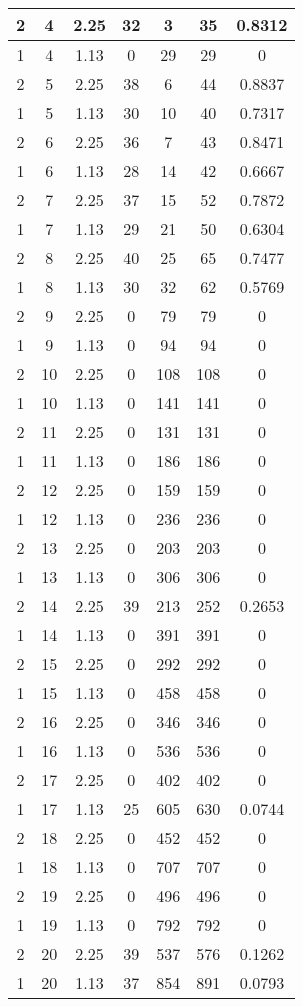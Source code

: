 \documentclass[letterpaper, 12pt]{article}
\begin{document}
\begin{longtable}{|c|c|c|c|c|c|c|}
\hline
2 & 4 & 2.25 & 32 & 3 & 35 & 0.8312 \\
\hline
1 & 4 & 1.13 & 0 & 29 & 29 & 0 \\
\hline
2 & 5 & 2.25 & 38 & 6 & 44 & 0.8837 \\
\hline
1 & 5 & 1.13 & 30 & 10 & 40 & 0.7317 \\
\hline
2 & 6 & 2.25 & 36 & 7 & 43 & 0.8471 \\
\hline
1 & 6 & 1.13 & 28 & 14 & 42 & 0.6667 \\
\hline
2 & 7 & 2.25 & 37 & 15 & 52 & 0.7872 \\
\hline
1 & 7 & 1.13 & 29 & 21 & 50 & 0.6304 \\
\hline
2 & 8 & 2.25 & 40 & 25 & 65 & 0.7477 \\
\hline
1 & 8 & 1.13 & 30 & 32 & 62 & 0.5769 \\
\hline
2 & 9 & 2.25 & 0 & 79 & 79 & 0 \\
\hline
1 & 9 & 1.13 & 0 & 94 & 94 & 0 \\
\hline
2 & 10 & 2.25 & 0 & 108 & 108 & 0 \\
\hline
1 & 10 & 1.13 & 0 & 141 & 141 & 0 \\
\hline
2 & 11 & 2.25 & 0 & 131 & 131 & 0 \\
\hline
1 & 11 & 1.13 & 0 & 186 & 186 & 0 \\
\hline
2 & 12 & 2.25 & 0 & 159 & 159 & 0 \\
\hline
1 & 12 & 1.13 & 0 & 236 & 236 & 0 \\
\hline
2 & 13 & 2.25 & 0 & 203 & 203 & 0 \\
\hline
1 & 13 & 1.13 & 0 & 306 & 306 & 0 \\
\hline
2 & 14 & 2.25 & 39 & 213 & 252 & 0.2653 \\
\hline
1 & 14 & 1.13 & 0 & 391 & 391 & 0 \\
\hline
2 & 15 & 2.25 & 0 & 292 & 292 & 0 \\
\hline
1 & 15 & 1.13 & 0 & 458 & 458 & 0 \\
\hline
2 & 16 & 2.25 & 0 & 346 & 346 & 0 \\
\hline
1 & 16 & 1.13 & 0 & 536 & 536 & 0 \\
\hline
2 & 17 & 2.25 & 0 & 402 & 402 & 0 \\
\hline
1 & 17 & 1.13 & 25 & 605 & 630 & 0.0744 \\
\hline
2 & 18 & 2.25 & 0 & 452 & 452 & 0 \\
\hline
1 & 18 & 1.13 & 0 & 707 & 707 & 0 \\
\hline
2 & 19 & 2.25 & 0 & 496 & 496 & 0 \\
\hline
1 & 19 & 1.13 & 0 & 792 & 792 & 0 \\
\hline
2 & 20 & 2.25 & 39 & 537 & 576 & 0.1262 \\
\hline
1 & 20 & 1.13 & 37 & 854 & 891 & 0.0793 \\
\hline
\end{longtable}
\end{document}
